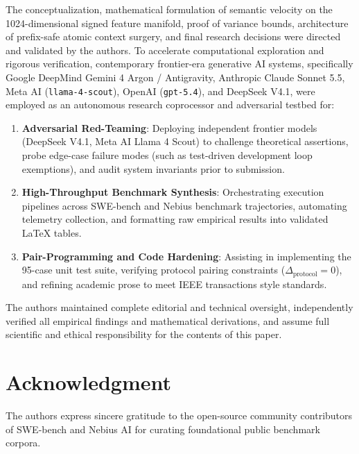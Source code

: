 \documentclass[journal]{IEEEtran}
\begin{document}
The conceptualization, mathematical formulation of semantic velocity on the 1024-dimensional signed feature manifold, proof of variance bounds, architecture of prefix-safe atomic context surgery, and final research decisions were directed and validated by the authors. To accelerate computational exploration and rigorous verification, contemporary frontier-era generative AI systems, specifically Google DeepMind Gemini 4 Argon / Antigravity, Anthropic Claude Sonnet 5.5, Meta AI (\texttt{llama-4-scout}), OpenAI (\texttt{gpt-5.4}), and DeepSeek V4.1, were employed as an autonomous research coprocessor and adversarial testbed for:
\begin{enumerate}[leftmargin=12pt, topsep=2pt, itemsep=1pt]
    \item \textbf{Adversarial Red-Teaming}: Deploying independent frontier models (DeepSeek V4.1, Meta AI Llama 4 Scout) to challenge theoretical assertions, probe edge-case failure modes (such as test-driven development loop exemptions), and audit system invariants prior to submission.
    \item \textbf{High-Throughput Benchmark Synthesis}: Orchestrating execution pipelines across SWE-bench and Nebius benchmark trajectories, automating telemetry collection, and formatting raw empirical results into validated LaTeX tables.
    \item \textbf{Pair-Programming and Code Hardening}: Assisting in implementing the 95-case unit test suite, verifying protocol pairing constraints ($\Delta_{\text{protocol}} = 0$), and refining academic prose to meet IEEE transactions style standards.
\end{enumerate}
The authors maintained complete editorial and technical oversight, independently verified all empirical findings and mathematical derivations, and assume full scientific and ethical responsibility for the contents of this paper.

\section*{Acknowledgment}
The authors express sincere gratitude to the open-source community contributors of SWE-bench and Nebius AI for curating foundational public benchmark corpora.



\end{document}
